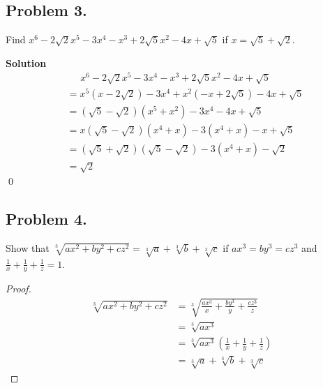 \documentclass{article}
\newenvironment{solution}{\begin{trivlist}\item[]{\bf Solution}}{\qed \end{trivlist}}
\begin{document}
\subsection*{Problem 3.}
Find $x^6 - 2\sqrt{2}x^5 - 3x^4 - x^3 + 2 \sqrt{5}x^2
- 4x + \sqrt{5}$ if $x = \sqrt{5} + \sqrt{2}$.
\begin{solution}
\begin{align*}
    &\quad\ \, x^6 - 2\sqrt{2}x^5 - 3x^4 - x^3
        + 2\sqrt{5}x^2 - 4x + \sqrt{5}\\
    &=x^5 \left( x - 2\sqrt{2} \right) - 3x^4
        + x^2 \left( -x + 2\sqrt{5} \right) - 4x + \sqrt{5} \\
    &= \left( \sqrt{5} - \sqrt{2} \right)(x^5 + x^2)
        - 3x^4 - 4x + \sqrt{5} \\
    &= x\left( \sqrt{5} - \sqrt{2} \right)(x^4 + x)
        - 3(x^4 + x) - x + \sqrt{5} \\
    &= \left( \sqrt{5} + \sqrt{2} \right)
            \left( \sqrt{5} - \sqrt{2} \right)
            - 3(x^4 + x) - \sqrt{2} \\
    &= \boxed{\sqrt{2}}
\end{align*}
\end{solution}

\subsection*{Problem 4.}
Show that $\sqrt[3]{ax^2 + by^2 + cz^2} =
\sqrt[3]{a} + \sqrt[3]{b} + \sqrt[3]{c}$ if
$ax^3 = by^3 = cz^3$ and $\frac{1}{x} + \frac{1}{y}
+ \frac{1}{z} = 1$.
\begin{proof}
\begin{align*}
    \sqrt[3]{ax^2 + by^2 + cz^2}
    &= \sqrt[3]{\frac{ax^3}{x} + \frac{by^3}{y} + \frac{cz^3}{z}} \\
    &= \sqrt[3]{ax^3} \\
    &= \sqrt[3]{ax^3}
        \left( \frac{1}{x} + \frac{1}{y} + \frac{1}{z} \right) \\
    &= \sqrt[3]{a} + \sqrt[3]{b} + \sqrt[3]{c}
\end{align*}
\end{proof}
\end{document}
